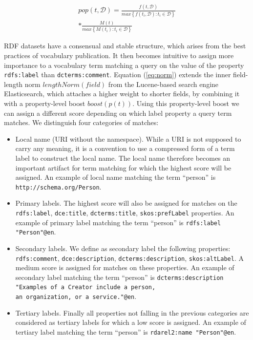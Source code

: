 \documentclass{iosart2c}
\begin{document}
\begin{equation}\label{eq:pop}
\begin{split}
pop(t,\mathcal{D}) = \frac{f(t,\mathcal{D})}{max\left\{f(t_i,\mathcal{D}): t_i \in \mathcal{D}\right\}} \\
* \frac{M(t)}{max\left\{M(t_i): t_i \in \mathcal{D}\right\}}
\end{split}
\end{equation}

RDF datasets have a consensual and stable  structure, which arises from the best practices of vocabulary publication. It then becomes intuitive to assign more importance to a vocabulary term matching a query on the value of the property {\small\texttt{rdfs:label}} than {\small\texttt{dcterms:comment}}. Equation (\ref{eq:norm}) extends the inner field-length norm $lengthNorm(field)$ from the Lucene-based search engine Elasticsearch, which attaches a higher weight to shorter fields, by combining it with a property-level boost $boost(p(t))$. Using this property-level boost we can assign a different score depending on which label property a query term matches. We distinguish four categories of matches: 
		\begin{itemize}
 			\item Local name (URI without the namespace). While a URI is not supposed to carry any meaning, it is a convention to use a compressed form of a term label to construct the local name. The local name therefore becomes an important artifact for term matching for which the highest score will be assigned. An example of local name matching the term ``person'' is {\small\texttt{http://schema.org/Person}}.
			\item Primary labels. The highest score will also be assigned for matches on the {\small\texttt{rdfs:label}}, {\small\texttt{dce:title}}, {\small\texttt{dcterms:title}}, {\small\texttt{skos:prefLabel}} properties. An example of primary label matching the term ``person'' is {\small\texttt{rdfs:label "Person"@en}}.
			\item Secondary labels. We define as secondary label the following properties: {\small\texttt{rdfs:comment}}, {\small\texttt{dce:description}}, {\small\texttt{dcterms:description}}, {\small\texttt{skos:altLabel}}. A medium score is assigned for matches on these properties. An example of secondary label matching the term ``person'' is {\small\texttt{dcterms:description}} {\small\texttt{"Examples of a Creator include a person,\\ an organization, or a service."@en}}.
			\item Tertiary labels. Finally all properties not falling in the previous categories are considered as tertiary labels for which a low score is assigned. An example of tertiary label matching the term ``person'' is {\small\texttt{rdarel2:name "Person"@en}}. 
		\end{itemize}
\end{document}
